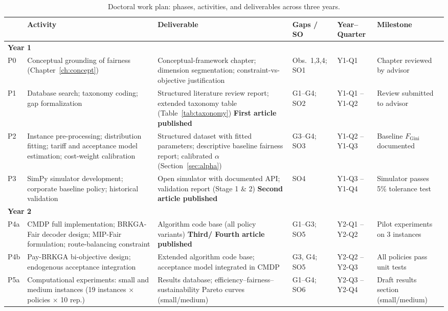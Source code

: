 \documentclass[12pt,a4paper]{report}
\begin{document}
\begin{table}[H]
\centering
\caption{Doctoral work plan: phases, activities, and deliverables across three years.}
\label{tab:workplan}
\scriptsize
\begin{tabularx}{1\linewidth}{p{0.4cm}p{3.5cm}p{3.8cm}p{2cm}p{2cm}p{2cm}}
\toprule
 & \textbf{Activity} & \textbf{Deliverable} & \textbf{Gaps / SO} &
 \textbf{Year--Quarter} & \textbf{Milestone} \\
\midrule
\multicolumn{6}{l}{\textbf{Year 1}} \\
\midrule
P0 & Conceptual grounding of fairness (Chapter~\ref{ch:concept}) &
     Conceptual-framework chapter; dimension segmentation; constraint-vs-objective justification & Obs.\ 1,3,4; SO1 & Y1-Q1 & Chapter reviewed by advisor \\
P1 & Database search; taxonomy coding; gap formalization &
     Structured literature review report; extended taxonomy table (Table~\ref{tab:taxonomy}) \textbf{First article published} & G1--G4; SO2 & Y1-Q1 -- Y1-Q2 & Review submitted to advisor \\
P2 & Instance pre-processing; distribution fitting; tariff and acceptance model estimation; cost-weight calibration &
     Structured dataset with fitted parameters; descriptive baseline fairness report; calibrated $\alpha$ (Section~\ref{sec:alpha}) & G3--G4; SO3 & Y1-Q2 -- Y1-Q3 & Baseline $F_{\text{Gini}}$ documented \\
P3 & SimPy simulator development; corporate baseline policy; historical validation &
     Open simulator with documented API; validation report (Stage 1 \& 2) \textbf{Second article published}& SO4 & Y1-Q3 -- Y1-Q4 & Simulator passes 5\% tolerance test \\
\midrule
\multicolumn{6}{l}{\textbf{Year 2}} \\
\midrule
P4a & CMDP full implementation; BRKGA-Fair decoder design; MIP-Fair formulation; route-balancing constraint &
      Algorithm code base (all policy variants) \textbf{Third/ Fourth article published} & G1--G3; SO5 & Y2-Q1 -- Y2-Q2 & Pilot experiments on 3 instances \\
P4b & Pay-BRKGA bi-objective design; endogenous acceptance integration &
      Extended algorithm code base; acceptance model integrated in CMDP & G3, G4; SO5 & Y2-Q2 -- Y2-Q3 & All policies pass unit tests \\
P5a & Computational experiments: small and medium instances (19 instances $\times$ policies $\times$ 10 rep.) & Results database; efficiency--fairness--sustainability Pareto curves (small/medium) & G1--G4; SO6 & Y2-Q3 -- Y2-Q4 & Draft results section (small/medium) \\

\end{tabularx}
\end{table}
\end{document}
